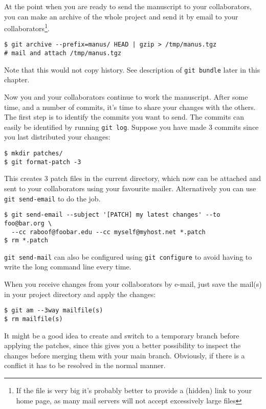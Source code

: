 \documentclass[a4paper,10pt]{article}
\begin{document}
At the point when you are ready to send the manuscript to your collaborators,
you can make an archive of the whole project and
send it by email to your collaborators\footnote{If the file is very big it's
probably better to provide a (hidden) link to your home page, as many mail
servers will not accept excessively large files}. 
\begin{verbatim}
$ git archive --prefix=manus/ HEAD | gzip > /tmp/manus.tgz
# mail and attach /tmp/manus.tgz
\end{verbatim}
Note that this would not copy history. See description of 
\texttt{git bundle} later in this chapter.

Now you and your collaborators continue to work the manuscript. After some
time, and a number of commits, it's time to share your changes with the 
others. The first step is to identify the commits you want to send. The
commits can easily be identified by running \texttt{git log}. Suppose you have
made 3 commits since you last distributed your changes:
\begin{verbatim}
$ mkdir patches/
$ git format-patch -3
\end{verbatim}
This creates 3 patch files in the current directory, which now can be attached
and sent to your collaborators using your favourite mailer. Alternatively you
can use \texttt{git send-email} to do the job.
\begin{verbatim}
$ git send-email --subject '[PATCH] my latest changes' --to foo@bar.org \
  --cc raboof@foobar.edu --cc myself@myhost.net *.patch
$ rm *.patch
\end{verbatim}
\texttt{git send-mail} can also be configured using \texttt{git configure} to
avoid having to write the long command line every time.

When you receive changes from your collaborators by e-mail, just save the
mail(s) in your project directory and apply the changes:
\begin{verbatim}
$ git am --3way mailfile(s)
$ rm mailfile(s)
\end{verbatim}
It might be a good idea to create and switch to a temporary branch before 
applying the patches, since this gives you a better possibility to inspect the 
changes before merging them with your main branch. Obviously, if there is a
conflict it has to be resolved in the normal manner.
\end{document}
